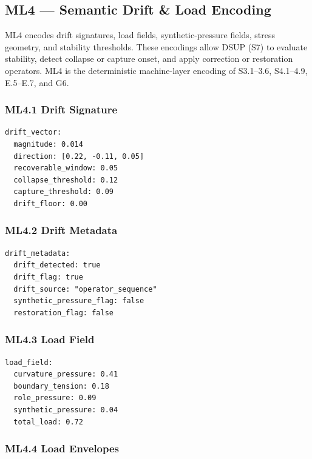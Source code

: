 \subsection*{ML4 — Semantic Drift \& Load Encoding}

ML4 encodes drift signatures, load fields, synthetic-pressure fields, stress
geometry, and stability thresholds. These encodings allow DSUP (S7) to evaluate
stability, detect collapse or capture onset, and apply correction or restoration
operators. ML4 is the deterministic machine-layer encoding of S3.1–3.6,
S4.1–4.9, E.5–E.7, and G6.

\subsubsection*{ML4.1 Drift Signature}

\begin{verbatim}
drift_vector:
  magnitude: 0.014
  direction: [0.22, -0.11, 0.05]
  recoverable_window: 0.05
  collapse_threshold: 0.12
  capture_threshold: 0.09
  drift_floor: 0.00
\end{verbatim}

\subsubsection*{ML4.2 Drift Metadata}

\begin{verbatim}
drift_metadata:
  drift_detected: true
  drift_flag: true
  drift_source: "operator_sequence"
  synthetic_pressure_flag: false
  restoration_flag: false
\end{verbatim}
\subsubsection*{ML4.3 Load Field}

\begin{verbatim}
load_field:
  curvature_pressure: 0.41
  boundary_tension: 0.18
  role_pressure: 0.09
  synthetic_pressure: 0.04
  total_load: 0.72
\end{verbatim}
\subsubsection*{ML4.4 Load Envelopes}

